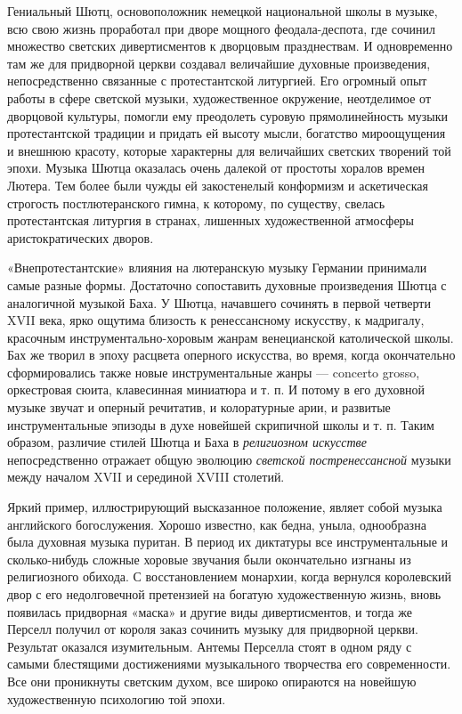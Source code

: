 Гениальный Шютц, основоположник немецкой  национальной школы в музыке,
всю  свою  жизнь проработал  при  дворе  мощного феодала-деспота,  где
сочинил множество светских дивертисментов  к дворцовым празднествам. И
одновременно там же для придворной церкви создавал величайшие духовные
произведения,  непосредственно связанные  с протестантской  литургией.
Его  огромный  опыт работы  в  сфере  светской музыки,  художественное
окружение, неотделимое  от дворцовой культуры, помогли  ему преодолеть
суровую прямолинейность  музыки протестантской  традиции и  придать ей
высоту  мысли,  богатство  мироощущения  и  внешнюю  красоту,  которые
характерны  для   величайших  светских  творений  той   эпохи.  Музыка
Шютца  оказалась  очень далекой  от  простоты  хоралов времен  Лютера.
Тем  более  были  чужды  ей  закостенелый  конформизм  и  аскетическая
строгость  постлютеранского гимна,  к которому,  по существу,  свелась
протестантская литургия  в странах, лишенных  художественной атмосферы
аристократических дворов.

«Внепротестантские» влияния  на лютеранскую музыку  Германии принимали
самые  разные  формы.  Достаточно  сопоставить  духовные  произведения
Шютца  с  аналогичной музыкой  Баха.  У  Шютца, начавшего  сочинять  в
первой  четверти  XVII века,  ярко  ощутима  близость к  ренессансному
искусству,  к  мадригалу,   красочным  инструментально-хоровым  жанрам
венецианской  католической  школы.  Бах  же творил  в  эпоху  расцвета
оперного  искусства,  во   время,  когда  окончательно  сформировались
также новые  инструментальные жанры  --- concerto  grosso, оркестровая
сюита,  клавесинная  миниатюра  и  т.  п.  И  потому  в  его  духовной
музыке звучат  и оперный  речитатив, и  колоратурные арии,  и развитые
инструментальные  эпизоды в  духе новейшей  скрипичной школы  и т.  п.
Таким  образом,  различие  стилей  Шютца и  Баха  в  \emph{религиозном
искусстве}  непосредственно  отражает  общую  эволюцию  \emph{светской
постренессансной}  музыки   между  началом  XVII  и   серединой  XVIII
столетий.

Яркий  пример,  иллюстрирующий  высказанное  положение,  являет  собой
музыка английского  богослужения. Хорошо  известно, как  бедна, уныла,
однообразна  была  духовная  музыка  пуритан. В  период  их  диктатуры
все инструментальные  и сколько-нибудь  сложные хоровые  звучания были
окончательно  изгнаны  из   религиозного  обихода.  С  восстановлением
монархии,  когда   вернулся  королевский  двор  с   его  недолговечной
претензией на богатую художественную жизнь, вновь появилась придворная
«маска»  и другие  виды  дивертисментов, и  тогда  же Перселл  получил
от  короля  заказ сочинить  музыку  для  придворной церкви.  Результат
оказался изумительным.  Антемы Перселла  стоят в  одном ряду  с самыми
блестящими достижениями музыкального творчества его современности. Все
они  проникнуты  светским  духом,  все широко  опираются  на  новейшую
художественную психологию той эпохи.

